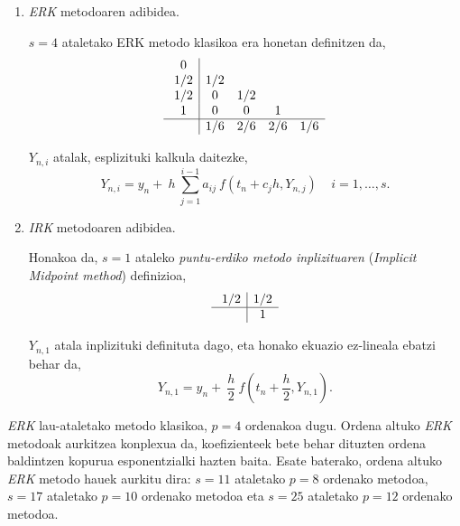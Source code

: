 \begin{enumerate}
\item \emph{ERK} metodoaren adibidea.

$s=4$ ataletako ERK metodo klasikoa era honetan definitzen da, 
\begin{equation*}
\begin{array}{c|cccc}
  \ 0   &    &    &     &      \\
  \ 1/2 & 1/2 &   &     &      \\
  \ 1/2 & 0   & 1/2  &  &      \\
  \ 1   & 0   & 0    &  1   &   \\
  \hline
  \     & 1/6 & 2/6  &  2/6 & 1/6 \\
  \end{array} \\
\end{equation*}

$Y_{n,i}$ atalak, esplizituki kalkula daitezke,
\begin{equation*}
Y_{n,i}=y_n+\ h\ \sum^{i-1}_{j=1}{a_{ij}\ f(t_n+c_jh,Y_{n,j})}\ \ \ \ \ i=1 ,\dots, s.
\end{equation*}  

\item \emph{IRK} metodoaren adibidea.

Honakoa da, $s=1$ ataleko \emph{puntu-erdiko metodo inplizituaren} (\emph{Implicit Midpoint method}) definizioa, 
\begin{equation*}
\begin{array}{c|c}
  \ 1/2 &  1/2\\
  \hline
  \     & 1 \\
\end{array} \\
\end{equation*}

$Y_{n,1}$ atala inplizituki definituta dago, eta honako ekuazio ez-lineala ebatzi behar da,
\begin{equation*}
Y_{n,1}=y_n+\ \frac{h}{2} \ f(t_n+\frac{h}{2},Y_{n,1}).
\end{equation*} 

\end{enumerate}

\emph{ERK} lau-ataletako  metodo klasikoa, $p=4$ ordenakoa dugu. Ordena altuko \emph{ERK} metodoak aurkitzea konplexua da,  koefizienteek bete behar dituzten ordena baldintzen kopurua esponentzialki hazten baita. Esate baterako, ordena altuko \emph {ERK} metodo hauek aurkitu dira:  $s=11$ ataletako $p=8$ ordenako metodoa,  $s=17$ ataletako $p=10$ ordenako metodoa eta  $s=25$ ataletako $p=12$ ordenako metodoa.


